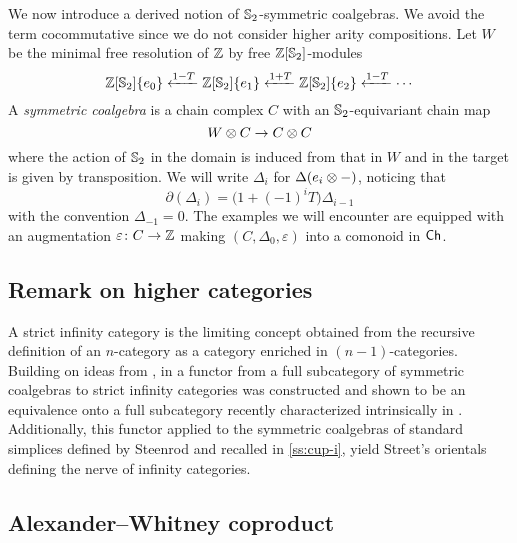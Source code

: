 We now introduce a derived notion of $\mathbb{S}_2$-symmetric coalgebras.
We avoid the term cocommutative since we do not consider higher arity compositions.
Let $W$ be the minimal free resolution of $\mathbb{Z}$ by free $\mathbb{Z}[\mathbb{S}_2]$-modules
\[
\mathbb{Z}[\mathbb{S}_2]\{e_0\} \xleftarrow{1-T} \mathbb{Z}[\mathbb{S}_2]\{e_1\} \xleftarrow{1+T} \mathbb{Z}[\mathbb{S}_2]\{e_2\} \xleftarrow{1-T} \dotsb
\]
A \textit{symmetric coalgebra} is a chain complex $C$ with an $\mathbb{S}_2$-equivariant chain map
\[
W \otimes C \to C \otimes C
\]
where the action of $\mathbb{S}_2$ in the domain is induced from that in $W$ and in the target is given by transposition.
We will write $\Delta_i$ for $\Delta(e_i \otimes -)$, noticing that
\[
\partial(\Delta_i) = \big( 1+(-1)^i T \big) \Delta_{i-1}
\]
with the convention $\Delta_{-1} = 0$.
The examples we will encounter are equipped with an augmentation $\varepsilon \colon C \to \mathbb{Z}$ making $(C, \Delta_0, \varepsilon)$ into a comonoid in $\mathsf{Ch}$.

\subsection{Remark on higher categories}
\label{ss:higher categories}

A strict infinity category is the limiting concept obtained from the recursive definition of an $n$-category as a category enriched in $(n-1)$-categories.
Building on ideas from \cite{brown1981cubes, kapranov1991polycategory, steiner2004omega}, in \cite{medina2020globular} a functor from a full subcategory of symmetric coalgebras to strict infinity categories was constructed and shown to be an equivalence onto a full subcategory recently characterized intrinsically in \cite{ozornova2022steiner}.
Additionally, this functor applied to the symmetric coalgebras of standard simplices defined by Steenrod and recalled in \cref{ss:cup-i}, yield Street's orientals \cite{street1987orientals} defining the nerve of infinity categories.




\subsection{Alexander--Whitney coproduct} \label{ss:aw diagonal}

